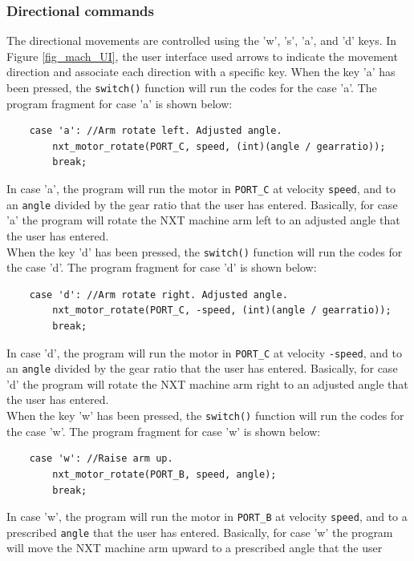 \documentclass[12pt]{article}
\begin{document}
\subsubsection*{Directional commands}
The directional movements are controlled using the 'w', 's', 'a', and 'd' keys.
In Figure \ref{fig_mach_UI}, the user interface used arrows to indicate the movement direction and associate
    each direction with a specific key.
\newline
When the key 'a' has been pressed, the \verb+switch()+ function will run the codes for the case 'a'.
The program fragment for case 'a' is shown below:
\begin{verbatim} 
    case 'a': //Arm rotate left. Adjusted angle.
        nxt_motor_rotate(PORT_C, speed, (int)(angle / gearratio));
        break;
\end{verbatim}
In case 'a', the program will run the motor in \verb+PORT_C+ at velocity \verb+speed+, and to an \verb+angle+
    divided by the gear ratio that the user has entered.
Basically, for case 'a' the program will rotate the NXT machine arm left to an adjusted angle that the user
    has entered.
\\
When the key 'd' has been pressed, the \verb+switch()+ function will run the codes for the case 'd'.
The program fragment for case 'd' is shown below:
\begin{verbatim} 
    case 'd': //Arm rotate right. Adjusted angle.
        nxt_motor_rotate(PORT_C, -speed, (int)(angle / gearratio));
        break;
\end{verbatim}
In case 'd', the program will run the motor in \verb+PORT_C+ at velocity \verb+-speed+, and to an \verb+angle+
    divided by the gear ratio that the user has entered.
Basically, for case 'd' the program will rotate the NXT machine arm right to an adjusted angle that the user
    has entered.
\\
When the key 'w' has been pressed, the \verb+switch()+ function will run the codes for the case 'w'.
The program fragment for case 'w' is shown below:
\begin{verbatim} 
    case 'w': //Raise arm up.
        nxt_motor_rotate(PORT_B, speed, angle);
        break;
\end{verbatim}
In case 'w', the program will run the motor in \verb+PORT_B+ at velocity \verb+speed+, and to a prescribed
    \verb+angle+ that the user has entered.
Basically, for case 'w' the program will move the NXT machine arm upward to a prescribed angle that the user
\end{document}
